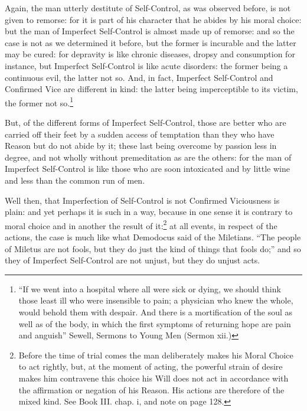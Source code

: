 Again, the man utterly destitute of Self-Control, as was observed before, is
not given to remorse: for it is part of his character that he abides by his
moral choice: but the man of Imperfect Self-Control is almost made up of
remorse: and so the case is not as we determined it before, but the former is
incurable and the latter may be cured: for depravity is like chronic diseases,
dropsy and consumption for instance, but Imperfect Self-Control is like acute
disorders: the former being a continuous evil, the latter not so. And, in fact,
Imperfect Self-Control and Confirmed Vice are different in kind: the latter
being imperceptible to its victim, the former not
so.\footnote{“If we went into a hospital where all were sick or dying, we should think
those least ill who were insensible to pain; a physician who knew the whole,
would behold them with despair. And there is a mortification of the soul as
well as of the body, in which the first symptoms of returning hope are pain and
anguish” Sewell, Sermons to Young Men (Sermon xii.)}

But, of the different forms of Imperfect Self-Control, those are better who are
carried off their feet by a sudden access of temptation than they who have
Reason but do not abide by it; these last being overcome by passion less in
degree, and not wholly without premeditation as are the others: for the man of
Imperfect Self-Control is like those who are soon intoxicated and by little
wine and less than the common run of men.

Well then, that Imperfection of Self-Control is not Confirmed Viciousness is
plain: and yet perhaps it is such in a way, because in one sense it is contrary
to moral choice and in another the result of it:\footnote{Before the time of trial comes the man deliberately makes his Moral Choice to
act rightly, but, at the moment of acting, the powerful strain of desire makes
him contravene this choice his Will does not act in accordance with the
affirmation or negation of his Reason. His actions are therefore of the mixed
kind. See Book III. chap. i, and note on page 128.}
at all events, in respect of the actions, the case is much like what Demodocus
said of the Miletians. “The people of Miletus are not fools, but they do
just the kind of things that fools do;” and so they of Imperfect
Self-Control are not unjust, but they do unjust acts.

